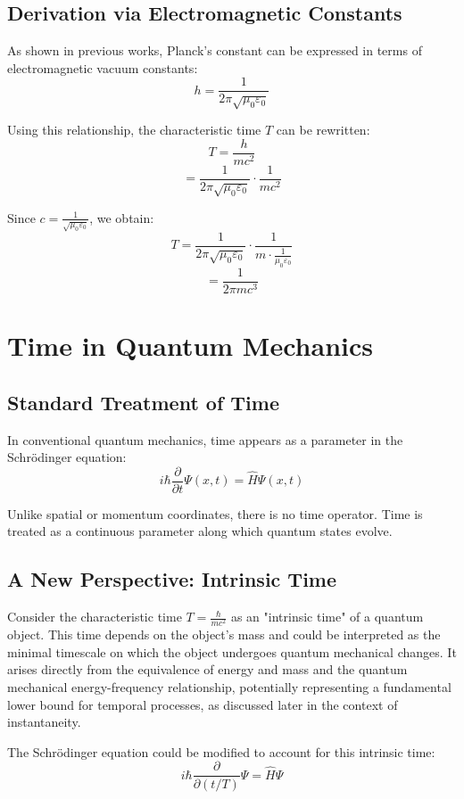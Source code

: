 \documentclass{article}
\begin{document}
	\subsection{Derivation via Electromagnetic Constants}
	
	As shown in previous works, Planck's constant can be expressed in terms of electromagnetic vacuum constants:
	\[
	h = \frac{1}{2\pi\sqrt{\mu_0\varepsilon_0}}
	\]
	
	Using this relationship, the characteristic time \(T\) can be rewritten:
	\[
	T = \frac{h}{mc^2}
	\]
	\[
	= \frac{1}{2\pi\sqrt{\mu_0\varepsilon_0}} \cdot \frac{1}{mc^2}
	\]
	
	Since \(c = \frac{1}{\sqrt{\mu_0\varepsilon_0}}\), we obtain:
	\[
	T = \frac{1}{2\pi\sqrt{\mu_0\varepsilon_0}} \cdot \frac{1}{m \cdot \frac{1}{\mu_0\varepsilon_0}}
	\]
	\[
	= \frac{1}{2\pi m c^3}
	\]
	
	\section{Time in Quantum Mechanics}
	
	\subsection{Standard Treatment of Time}
	
	In conventional quantum mechanics, time appears as a parameter in the Schrödinger equation:
	\[
	i\hbar \frac{\partial}{\partial t}\Psi(x,t) = \hat{H}\Psi(x,t)
	\]
	
	Unlike spatial or momentum coordinates, there is no time operator. Time is treated as a continuous parameter along which quantum states evolve.
	
	\subsection{A New Perspective: Intrinsic Time}
	
	Consider the characteristic time \(T = \frac{\hbar}{mc^2}\) as an "intrinsic time" of a quantum object. This time depends on the object's mass and could be interpreted as the minimal timescale on which the object undergoes quantum mechanical changes. It arises directly from the equivalence of energy and mass and the quantum mechanical energy-frequency relationship, potentially representing a fundamental lower bound for temporal processes, as discussed later in the context of instantaneity.
	
	The Schrödinger equation could be modified to account for this intrinsic time:
	\[
	i\hbar \frac{\partial}{\partial (t/T)}\Psi = \hat{H}\Psi
	\]
	
\end{document}
